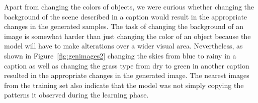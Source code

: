 \documentclass{article} %
\begin{document}
Apart from changing the colors of objects, we were curious whether changing the background of the scene described in a caption would result in the appropriate changes in the generated samples. The task of changing the background of an image is somewhat harder than just changing the color of an object because the model will have to make alterations over a wider visual area. Nevertheless, as shown in Figure~\ref{fig:genimages2} changing the skies from blue to rainy in a caption as well as changing the grass type from dry to green in another caption resulted in the appropriate changes in the generated image. The nearest images from the training set also indicate that the model was not simply copying the patterns it observed during the learning phase.

\begin{figure}[!h]
\captionsetup[subfigure]{labelformat=empty}
\begin{center}
\quad
%
\quad
%
\quad
%
\\
\vspace{-0.45cm}
%
\quad

\end{center}
\end{figure}
\end{document}
